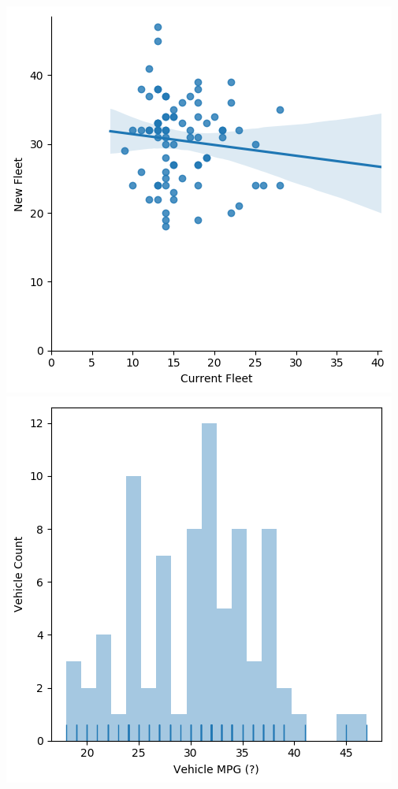 \documentclass[a4paper]{article}
\begin{document}
\begin{center}
   \includegraphics[scale=0.8]{veh_scatterplot.png}
   \includegraphics[scale=0.8]{veh_histogram.png}
\end{center}
\end{document}
